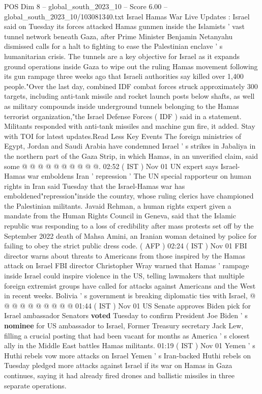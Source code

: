 \begin{textsample}{POS Dim 8 – global\_south\_2023\_10 – Score 6.00 – global\_south\_2023\_10/103081340.txt}  \label{ex:f8_pos_361}
Israel Hamas War Live Updates : Israel said on Tuesday its forces attacked Hamas gunmen inside the Islamists ' vast tunnel network beneath Gaza, after Prime Minister Benjamin Netanyahu dismissed calls for a halt to fighting to ease the Palestinian enclave ' s humanitarian crisis.
The tunnels are a key objective for Israel as it expands ground operations inside Gaza to wipe out the ruling Hamas movement following its gun rampage three weeks ago that Israeli authorities say killed over 1,400 people."Over the last day, combined IDF combat forces struck approximately 300 targets, including anti-tank missile and rocket launch posts below shafts, as well as military compounds inside underground tunnels belonging to the Hamas terrorist organization,"the Israel Defense Forces ( IDF ) said in a statement.
Militants responded with anti-tank missiles and machine gun fire, it added.
Stay with TOI for latest updates.Read Less Key Events The foreign ministries of Egypt, Jordan and Saudi Arabia have condemned Israel ' s strikes in Jabaliya in the northern part of the Gaza Strip, in which Hamas, in an unverified claim, said some @ @ @ @ @ @ @ @ @ @. 02:52 ( IST ) Nov 01 UN expert says Israel-Hamas war emboldens Iran ' repression ' The UN special rapporteur on human rights in Iran said Tuesday that the Israel-Hamas war has emboldened"repression"inside the country, whose ruling clerics have championed the Palestinian militants.
Javaid Rehman, a human rights expert given a mandate from the Human Rights Council in Geneva, said that the Islamic republic was responding to a loss of credibility after mass protests set off by the September 2022 death of Mahsa Amini, an Iranian woman detained by police for failing to obey the strict public dress code. ( AFP ) 02:24 ( IST ) Nov 01 FBI director warns about threats to Americans from those inspired by the Hamas attack on Israel FBI director Christopher Wray warned that Hamas ' rampage inside Israel could inspire violence in the US, telling lawmakers that multiple foreign extremist groups have called for attacks against Americans and the West in recent weeks.
Bolivia ' s government is breaking diplomatic ties with Israel, @ @ @ @ @ @ @ @ @ @ 01:44 ( IST ) Nov 01 US Senate approves Biden pick for Israel ambassador Senators \textbf{voted} Tuesday to confirm President Joe Biden ' s \textbf{nominee} for US ambassador to Israel, Former Treasury secretary Jack Lew, filling a crucial posting that had been vacant for months as America ' s closest ally in the Middle East battles Hamas militants. 01:19 ( IST ) Nov 01 Yemen ' s Huthi rebels vow more attacks on Israel Yemen ' s Iran-backed Huthi rebels on Tuesday pledged more attacks against Israel if its war on Hamas in Gaza continues, saying it had already fired drones and ballistic missiles in three separate operations.

\end{textsample}
